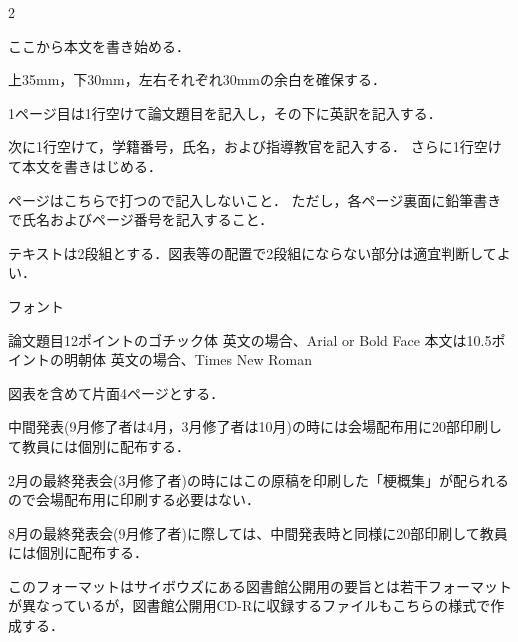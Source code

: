 \documentclass{article}
\begin{document}
\begin{multicols}{2}
\setmainfont{Times New Roman}

\fontsize{10.5}{19}\selectfont
ここから本文を書き始める．

上35mm，下30mm，左右それぞれ30mmの余白を確保する．

1ページ目は1行空けて論文題目を記入し，その下に英訳を記入する．

次に1行空けて，学籍番号，氏名，および指導教官を記入する．
さらに1行空けて本文を書きはじめる．

ページはこちらで打つので記入しないこと．
ただし，各ページ裏面に鉛筆書きで氏名およびページ番号を記入すること．

テキストは2段組とする．図表等の配置で2段組にならない部分は適宜判断してよい．

フォント

論文題目12ポイントのゴチック体
英文の場合、Arial or Bold Face
本文は10.5ポイントの明朝体
英文の場合、Times New Roman

図表を含めて片面4ページとする．

中間発表(9月修了者は4月，3月修了者は10月)の時には会場配布用に20部印刷して教員には個別に配布する．

2月の最終発表会(3月修了者)の時にはこの原稿を印刷した「梗概集」が配られるので会場配布用に印刷する必要はない．

8月の最終発表会(9月修了者)に際しては、中間発表時と同様に20部印刷して教員には個別に配布する．

このフォーマットはサイボウズにある図書館公開用の要旨とは若干フォーマットが異なっているが，図書館公開用CD-Rに収録するファイルもこちらの様式で作成する\cite{einstein}．

\lipsum[1-10]
% 
% 
% 
% 
% 






\end{multicols}
\end{document}
